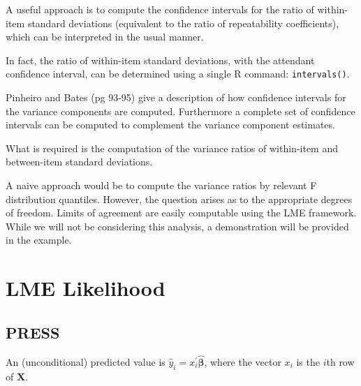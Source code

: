 \documentclass[12pt, a4paper]{report}
\theoremstyle{plain}
\theoremstyle{definition}
\theoremstyle{remark}
\begin{document}
A useful approach is to compute the confidence intervals for the ratio of within-item standard deviations (equivalent to the ratio of repeatability coefficients), which can be interpreted in the usual manner.  

In fact, the ratio of within-item standard deviations, with the attendant confidence interval,  can be determined using a single R command: \texttt{intervals()}.

Pinheiro and Bates (pg 93-95) give a description of how confidence intervals for the variance components are computed. Furthermore a complete set of confidence intervals can be computed to complement the variance component estimates. 

What is required is the computation of the variance ratios of within-item and between-item standard deviations.  

A naive  approach would be to compute the variance ratios by relevant F distribution quantiles. However, the question arises as to the appropriate degrees of freedom.
Limits of agreement are easily computable using the LME framework. While we will not be considering this analysis, a demonstration will be provided in the example.



	\chapter{LME Likelihood}

\section{PRESS}
	
	
	
	
	
	An (unconditional) predicted value is $\hat{y}_i = x^{\prime}_i \boldsymbol{\hat{\beta}}$, where
	the vector $x_i$ is the $i$th row of $\boldsymbol{X}$.
	
	
\end{document}

